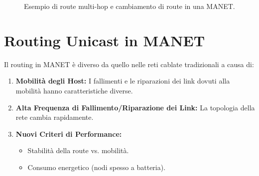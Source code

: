 \begin{figure}[H]
    \centering
    \caption{Esempio di route multi-hop e cambiamento di route in una MANET.}
    \label{fig:manet_multihop}
\end{figure}

\section{Routing Unicast in MANET}
Il routing in MANET è diverso da quello nelle reti cablate tradizionali a causa di:
\begin{enumerate}
    \item \textbf{Mobilità degli Host:} I fallimenti e le riparazioni dei link dovuti alla mobilità hanno caratteristiche diverse.
    \item \textbf{Alta Frequenza di Fallimento/Riparazione dei Link:} La topologia della rete cambia rapidamente.
    \item \textbf{Nuovi Criteri di Performance:}
    \begin{itemize}
        \item Stabilità della route vs. mobilità.
        \item Consumo energetico (nodi spesso a batteria).
    \end{itemize}
\end{enumerate}

